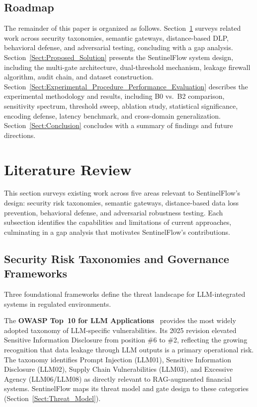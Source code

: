 \documentclass[journal]{IEEEtran}
\begin{document}
\subsection{Roadmap}
\label{Sect:Roadmap}

The remainder of this paper is organized as follows. Section~\ref{Sect:Literature_Review} surveys related work across security taxonomies, semantic gateways, distance-based DLP, behavioral defense, and adversarial testing, concluding with a gap analysis. Section~\ref{Sect:Proposed_Solution} presents the SentinelFlow system design, including the multi-gate architecture, dual-threshold mechanism, leakage firewall algorithm, audit chain, and dataset construction. Section~\ref{Sect:Experimental_Procedure_Performance_Evaluation} describes the experimental methodology and results, including B0 vs.\ B2 comparison, sensitivity spectrum, threshold sweep, ablation study, statistical significance, encoding defense, latency benchmark, and cross-domain generalization. Section~\ref{Sect:Conclusion} concludes with a summary of findings and future directions.

\section{Literature Review}
\label{Sect:Literature_Review}
%

This section surveys existing work across five areas relevant to SentinelFlow's design: security risk taxonomies, semantic gateways, distance-based data loss prevention, behavioral defense, and adversarial robustness testing. Each subsection identifies the capabilities and limitations of current approaches, culminating in a gap analysis that motivates SentinelFlow's contributions.

\subsection{Security Risk Taxonomies and Governance Frameworks}
\label{Sect:LR_Taxonomies}

Three foundational frameworks define the threat landscape for LLM-integrated systems in regulated environments.

The \textbf{OWASP Top~10 for LLM Applications}~\cite{owasp_llm_2025} provides the most widely adopted taxonomy of LLM-specific vulnerabilities. Its 2025 revision elevated Sensitive Information Disclosure from position \#6 to \#2, reflecting the growing recognition that data leakage through LLM outputs is a primary operational risk. The taxonomy identifies Prompt Injection (LLM01), Sensitive Information Disclosure (LLM02), Supply Chain Vulnerabilities (LLM03), and Excessive Agency (LLM06/LLM08) as directly relevant to RAG-augmented financial systems. SentinelFlow maps its threat model and gate design to these categories (Section~\ref{Sect:Threat_Model}).
\end{document}
